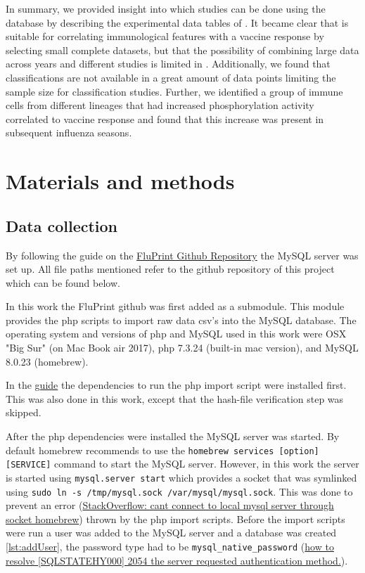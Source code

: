 In summary, we provided insight into which studies can be done using the \flup database by describing the experimental data tables of \flup.
It became clear that \flup is suitable for correlating immunological features with a vaccine response by selecting small complete datasets, but that the possibility of combining large data across years and different studies is limited in \flup.
Additionally, we found that classifications are not available in a great amount of data points limiting the sample size for classification studies.
Further, we identified a group of immune cells from different lineages that had increased phosphorylation activity correlated to vaccine response and found that this increase was present in subsequent influenza seasons.

\section{Materials and methods}

\subsection{Data collection}

By following the guide on the \href{https://github.com/LogIN-/fluprint}{FluPrint Github Repository} the MySQL
server was set up.
All file paths mentioned refer to the github repository of this project which can be found below.

In this work the FluPrint github was first added as a submodule.
This module provides the php scripts to import raw data csv's into the MySQL database.
The operating system and versions of php and MySQL used in this work were OSX "Big Sur" (on Mac Book air 2017), php 7.3.24 (built-in mac version), and MySQL 8.0.23 (homebrew).

In the \href{https://github.com/LogIN-/fluprint}{guide} the dependencies to run
the php import script were installed first. This was also done in this work,
except that the hash-file verification step was skipped.

After the php dependencies were installed the MySQL server was started. By
default homebrew recommends to use the \lstinline{homebrew services [option] [SERVICE]} command to start the MySQL server. However, in this work the server
is started using \lstinline{mysql.server start} which provides a socket that
was symlinked using \lstinline{sudo ln -s /tmp/mysql.sock /var/mysql/mysql.sock}. This was done to prevent an error
(\href{https://stackoverflow.com/questions/15016376/cant-connect-to-local-mysql-server-through-socket-homebrew/18090173}{StackOverflow: cant connect to local mysql server through socket homebrew}) thrown
by the php import scripts. Before the import scripts were run a user was added to the
MySQL server and a database was created \ref{lst:addUser}, the password type had to be \lstinline{mysql_native_password}
(\href{https://stackoverflow.com/questions/62873680/how-to-resolve-sqlstatehy000-2054-the-server-requested-authentication-metho}{how to resolve [SQLSTATEHY000] 2054 the server requested authentication method.}).

